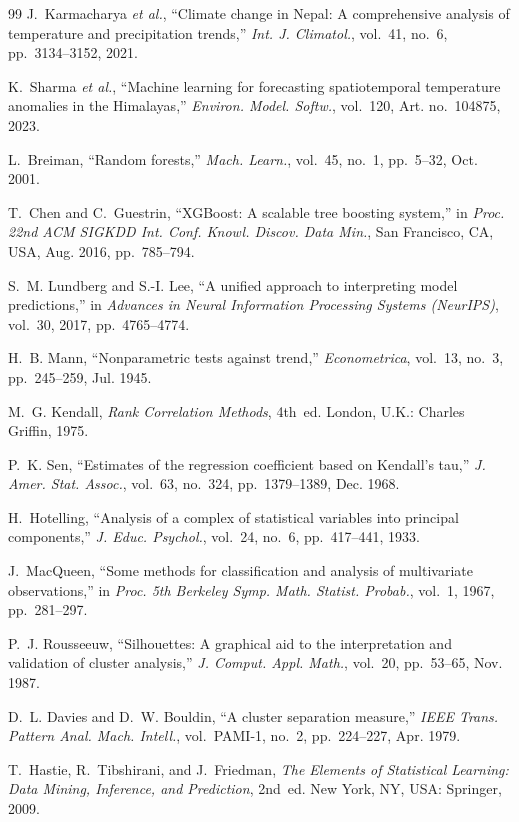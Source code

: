 \documentclass[conference]{IEEEtran}
\begin{document}
\begin{thebibliography}{99}
J.~Karmacharya \emph{et al.}, ``Climate change in Nepal: A comprehensive analysis of temperature and precipitation trends,'' \emph{Int. J. Climatol.}, vol.~41, no.~6, pp.~3134--3152, 2021.

K.~Sharma \emph{et al.}, ``Machine learning for forecasting spatiotemporal temperature anomalies in the Himalayas,'' \emph{Environ. Model. Softw.}, vol.~120, Art. no.~104875, 2023.

L.~Breiman, ``Random forests,'' \emph{Mach. Learn.}, vol.~45, no.~1, pp.~5--32, Oct. 2001.

T.~Chen and C.~Guestrin, ``XGBoost: A scalable tree boosting system,'' in \emph{Proc. 22nd ACM SIGKDD Int. Conf. Knowl. Discov. Data Min.}, San Francisco, CA, USA, Aug. 2016, pp.~785--794.

S.~M. Lundberg and S.-I. Lee, ``A unified approach to interpreting model predictions,'' in \emph{Advances in Neural Information Processing Systems (NeurIPS)}, vol.~30, 2017, pp.~4765--4774.

H.~B. Mann, ``Nonparametric tests against trend,'' \emph{Econometrica}, vol.~13, no.~3, pp.~245--259, Jul. 1945.

M.~G. Kendall, \emph{Rank Correlation Methods}, 4th~ed. London, U.K.: Charles Griffin, 1975.

P.~K. Sen, ``Estimates of the regression coefficient based on Kendall's tau,'' \emph{J. Amer. Stat. Assoc.}, vol.~63, no.~324, pp.~1379--1389, Dec. 1968.

H.~Hotelling, ``Analysis of a complex of statistical variables into principal components,'' \emph{J. Educ. Psychol.}, vol.~24, no.~6, pp.~417--441, 1933.

J.~MacQueen, ``Some methods for classification and analysis of multivariate observations,'' in \emph{Proc. 5th Berkeley Symp. Math. Statist. Probab.}, vol.~1, 1967, pp.~281--297.

P.~J. Rousseeuw, ``Silhouettes: A graphical aid to the interpretation and validation of cluster analysis,'' \emph{J. Comput. Appl. Math.}, vol.~20, pp.~53--65, Nov. 1987.

D.~L. Davies and D.~W. Bouldin, ``A cluster separation measure,'' \emph{IEEE Trans. Pattern Anal. Mach. Intell.}, vol.~PAMI-1, no.~2, pp.~224--227, Apr. 1979.

T.~Hastie, R.~Tibshirani, and J.~Friedman, \emph{The Elements of Statistical Learning: Data Mining, Inference, and Prediction}, 2nd~ed. New York, NY, USA: Springer, 2009.

\end{thebibliography}
\end{document}
